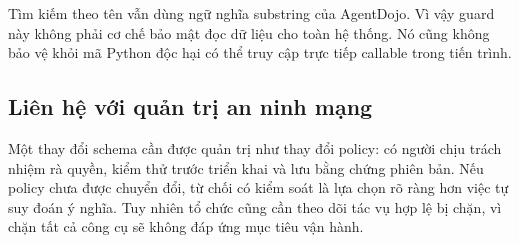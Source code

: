 Tìm kiếm theo tên vẫn dùng ngữ nghĩa substring của AgentDojo. Vì vậy guard này không phải cơ chế bảo mật đọc dữ liệu cho toàn hệ thống. Nó cũng không bảo vệ khỏi mã Python độc hại có thể truy cập trực tiếp callable trong tiến trình.

\subsection{Liên hệ với quản trị an ninh mạng}
Một thay đổi schema cần được quản trị như thay đổi policy: có người chịu trách nhiệm rà quyền, kiểm thử trước triển khai và lưu bằng chứng phiên bản. Nếu policy chưa được chuyển đổi, từ chối có kiểm soát là lựa chọn rõ ràng hơn việc tự suy đoán ý nghĩa. Tuy nhiên tổ chức cũng cần theo dõi tác vụ hợp lệ bị chặn, vì chặn tất cả công cụ sẽ không đáp ứng mục tiêu vận hành.

